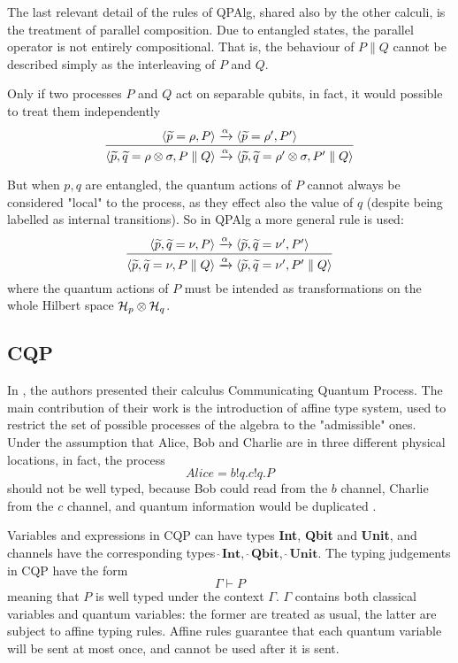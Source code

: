 
The last relevant detail of the rules of QPAlg, shared also by the other calculi, is the treatment of parallel composition. Due to entangled states, the parallel operator is not entirely compositional. That is, the behaviour of $P\parallel Q$ cannot be described simply as the interleaving of $P$ and $Q$.

Only if two processes $P$ and $Q$ act on separable qubits, in fact, it would possible to treat them independently
\[ \infer{\langle \widetilde{p},\widetilde{q}=\rho\otimes\sigma, P\parallel Q\rangle \xrightarrow{\alpha} \langle \widetilde{p},\widetilde{q}=\rho'\otimes\sigma, P'\parallel Q\rangle}{\langle \widetilde{p}=\rho, P\rangle \xrightarrow{\alpha} \langle \widetilde{p}=\rho', P'\rangle}\]


But when $p, q$ are entangled, the quantum actions of $P$ cannot always be considered "local" to the process, as they effect also the value of $q$ (despite being labelled as internal transitions). So in QPAlg a more general rule is used:
\[\infer{\langle \widetilde{p},\widetilde{q}=\nu, P\parallel Q\rangle \xrightarrow{\alpha} \langle \widetilde{p},\widetilde{q}=\nu', P'\parallel Q\rangle}{\langle \widetilde{p}, \widetilde{q}=\nu, P\rangle \xrightarrow{\alpha} \langle \widetilde{p}, \widetilde{q}=\nu', P'\rangle}\]
where the quantum actions of $P$ must be intended as transformations on the whole Hilbert space $\mathcal{H}_p \otimes \mathcal{H}_q$.



\subsection{CQP}
In \cite{gayCommunicatingQuantumProcesses2005}, the authors presented their calculus Communicating Quantum Process. The main contribution of their work is the introduction of affine type system, used to restrict the set of possible processes of the algebra to the "admissible" ones. Under the assumption that Alice, Bob and Charlie are in three different physical locations, in fact, the process \[Alice = b!q.c!q.P\] should not be well typed, because Bob could read from the $b$ channel, Charlie from the $c$ channel, and quantum information would be duplicated . 


Variables and expressions in CQP can have types \textbf{Int}, \textbf{Qbit} and \textbf{Unit}, and channels have the corresponding types $\widehat{\ }\textbf{Int}$, $\widehat{\ }\textbf{Qbit}$, $\widehat{\ }\textbf{Unit}$.
The typing judgements in CQP have the form \[\Gamma \vdash P\] meaning that $P$ is well typed under the context $\Gamma$. $\Gamma$ contains both classical variables and quantum variables: the former are treated as usual, the latter are subject to affine typing rules. Affine rules guarantee that each quantum variable will be sent at most once, and cannot be used after it is sent.

